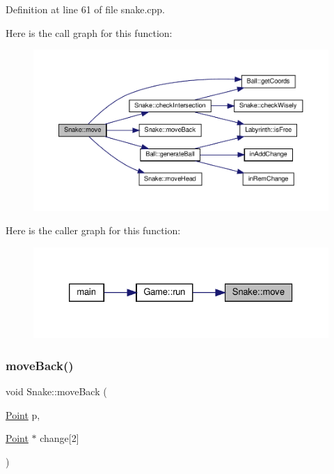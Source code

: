 Definition at line 61 of file snake.\+cpp.

Here is the call graph for this function\+:
\nopagebreak
\begin{figure}[H]
\begin{center}
\leavevmode
\includegraphics[width=350pt]{class_snake_a6181d41b0920aff3fda1a90d59e8d382_cgraph}
\end{center}
\end{figure}
Here is the caller graph for this function\+:
\nopagebreak
\begin{figure}[H]
\begin{center}
\leavevmode
\includegraphics[width=326pt]{class_snake_a6181d41b0920aff3fda1a90d59e8d382_icgraph}
\end{center}
\end{figure}
\mbox{\label{class_snake_a577892c68b457316f7a9f3944c464569}} 
\subsubsection{\texorpdfstring{moveBack()}{moveBack()}}
{\footnotesize\ttfamily void Snake\+::move\+Back (\begin{DoxyParamCaption}\item[{\mbox{\hyperlink{common_8h_aa9cfdb80b4ca12013a2de8a3b9b97981}{Point}}}]{p,  }\item[{\mbox{\hyperlink{common_8h_aa9cfdb80b4ca12013a2de8a3b9b97981}{Point}} $\ast$}]{change\mbox{[}2\mbox{]} }\end{DoxyParamCaption})\hspace{0.3cm}{\ttfamily [private]}}

